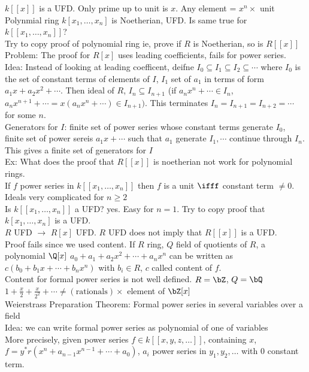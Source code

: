 \noindent
$k[[x]]$ is a UFD. Only prime up to unit is $x$. Any element = $x^n \times$ unit \\
Polynmial ring $k[x_1, \ldots, x_n]$ is Noetherian, UFD. Is same true for $k[[x_1, \ldots, x_n]]$? \\ 
Try to copy proof of polynomial ring ie, prove if $R$ is Noetherian, so is $R[[x]]$ \\
Problem: The proof for $R[x]$ uses leading coefficients, fails for power series. \\
Idea: Instead of looking at leading coefficent, deifne $I_0 \subseteq I_1 \subseteq I_2 \subseteq \cdots$ where $I_0$ is the set of constant terms of elements of $I$, $I_1$ set of $a_1$ in terms of form $a_1x + a_2x^2 + \cdots$. Then ideal of $R$, $I_n \subseteq I_{n+1}$ (if $a_nx^n + \cdots \in I_n$, $a_nx^{n+1} + \cdots = x(a_nx^n + \cdots) \in I_{n+1})$. This terminates $I_n = I_{n+1} = I_{n+2} = \cdots$ for some $n$. \\
Generators for $I$: finite set of power series whose constant terms generate $I_0$, finite set of power sereis $a_1x + \cdots$ such that $a_1$ generate $I_1, \cdots$ continue through $I_n$. This gives a finite set of generators for $I$ \\
Ex: What does the proof that $R[[x]]$ is noetherian not work for polynomial rings. \\

\noindent
If $f$ power series in $k[[x_1, \ldots, x_n]]$ then $f$ is a unit $\ifff$ constant term $\neq 0$. Ideals very complicated for $n \ge 2$ \\
Is $k[[x_1, \ldots, x_n]]$ a UFD? yes. Easy for $n=1$. Try to copy proof that $k[x_1, \ldots, x_n]$ is a UFD. \\
$R$ UFD $\to$ $R[x]$ UFD. $R$ UFD does not imply that $R[[x]]$ is a UFD. \\ 
Proof fails since we used content. If $R$ ring, $Q$ field of quotients of $R$, a polynomial $\Q[x]$ $a_0 + a_1 + a_2x^2 + \cdots + a_nx^n$ can be written as $c(b_0 + b_1 x + \cdots + b_nx^n)$ with $b_i \in R$, $c$ called content of $f$. \\
Content for formal power series is not well defined. $R = \bZ$, $Q = \bQ$ $1 + \frac{x}{2} + \frac{x}{2^2}  +\cdots \neq (\text{rationals}) \times$ element of $\bZ[x]$ \\

\noindent
Weierstrass Preparation Theorem: Formal power series in several variables over a field \\ 
Idea: we can write formal power series as polynomial of one of variables \\ 
More precisely, given power series $f \in k[[x, y, z, \ldots]]$, containing $x$, $f = y^* r(x^n + a_{n-1}x^{n-1} + \cdots + a_0)$, $a_i$ power series in $y_1, y_2, \ldots$ with 0 constant term. 

